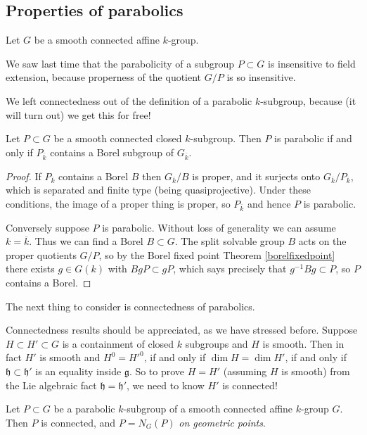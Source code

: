 \documentclass[10pt]{article}
\renewcommand{\(}{\left(}
\renewcommand{\)}{\right)}
\numberwithin{thm}{subsection}
\begin{document}
\subsection{Properties of parabolics}
Let $G$ be a smooth connected affine $k$-group.
\begin{rem}\label{}
We saw last time that the parabolicity of a subgroup $P\subset G$
is insensitive to field extension, because properness of the quotient
$G/P$ is so insensitive.
\end{rem}
\begin{rem}\label{}
We left connectedness out of the definition of a parabolic $k$-subgroup,
because (it will turn out) we get this for free!
\end{rem}
\begin{prop}\label{paraboliccontainsborel}
Let $P\subset G$ be a smooth connected closed $k$-subgroup.
Then $P$ is parabolic if and only if $P_{\overline{k}}$
contains a Borel subgroup of $G_{\overline{k}}$.
\end{prop}
\begin{proof}
If $P_{\overline{k}}$ contains a Borel $B$
then $G_{\overline{k}}/B$ is proper, and it surjects onto $G_{\overline{k}}/P_{\overline{k}}$, which is separated and finite type (being quasiprojective).
Under these conditions, the image of a proper thing is proper,
so $P_{\overline{k}}$ and hence $P$ is parabolic.

Conversely suppose $P$ is parabolic.
Without loss of generality we can assume $k=\overline{k}$.
Thus we can find a Borel $B\subset G$.
The split solvable group $B$ acts on the proper
quotients $G/P$,
so by the Borel fixed point Theorem \ref{borelfixedpoint} 
there exists $g\in G(k)$
with $BgP\subset gP$, which says precisely
that $g^{-1}Bg\subset P$,
so $P$ contains a Borel.
\end{proof}
The next thing to consider is connectedness of parabolics.
\begin{ex}\label{connectednessiscool}
Connectedness results should be appreciated, as we have stressed before.
Suppose $H\subset H'\subset G$ is a containment of closed $k$ subgroups
and $H$ is smooth.
Then in fact $H'$ is smooth and $H^0=H'^0$,
if and only if $\dim H= \dim H'$,
if and only if $\mathfrak{h}\subset \mathfrak{h}'$ is an equality inside $\mathfrak{g}$.
So to prove $H=H'$ (assuming $H$ is smooth)
from the Lie algebraic fact $\mathfrak{h}=\mathfrak{h}'$,
we need to know $H'$ is connected!
\end{ex}
\begin{thm}[Chevalley]
\label{parabolicconnected}
Let $P\subset G$ be a parabolic $k$-subgroup of a smooth connected
affine $k$-group $G$.
Then $P$ is connected, and $P=N_G(P)$ \textit{on geometric points}.
\end{thm}
\end{document}
